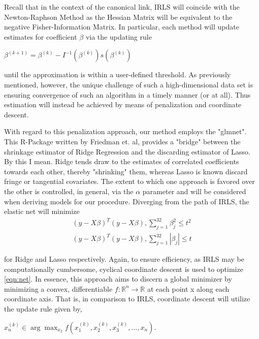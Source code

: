\documentclass[11pt]{article}
\begin{document}
  	Recall that in the context of the canonical link, IRLS will coincide with the Newton-Raphson Method as the Hessian Matrix will be equivalent to the negative Fisher-Information Matrix.  In particular, each method will update estimates for coefficient $\beta$ via the updating rule 
	
\begin{center}
$\beta^{(k+1)}=\beta^{(k)}-I^{-1}(\beta^{(k)})s(\beta^{(k)})$
\end{center}

 until the approximation is within a user-defined threshold.  As previously mentioned, however, the unique challenge of such a high-dimensional data set is ensuring convergence of such an algorithm in a timely manner (or at all).  Thus estimation will instead be achieved by means of penalization and coordinate descent.  
 	
	With regard to this penalization approach, our method employs the "glmnet".  This R-Package written by Friedman et. al, provides a "bridge" between the shrinkage estimator of Ridge Regression and the discarding estimator of Lasso.  By this I mean. Ridge tends draw to the estimates of correlated coefficients towards each other, thereby "shrinking" them, whereas Lasso is known discard fringe or tangential covariates.  The extent to which one approach is favored over the other is controlled, in general, via the $\alpha$ parameter and will be considered when deriving models for our procedure.   Diverging from the path of IRLS, the elastic net will minimize
	\begin{equation}
	\begin{align*}
\label{eqn:net}
(y-X\beta)^T(y-X\beta), \sum_{j=1}^{32} \beta_j^2 \le t^2 \\
(y-X\beta)^T(y-X\beta), \sum_{j=1}^{32} |\beta_j| \le t
\end{align*}
\end{equation}  

 for Ridge and Lasso respectively.   Again, to ensure efficiency, as IRLS may be computationally cumbersome, cyclical coordinate descent is used to optimize \eqref{eqn:net}.   In essence, this approach aims to discern a global minimizer by minimizing a convex, differentiable $f:\mathbb{R}^n \rightarrow \mathbb{R}$ at each point x along each coordinate axis.  That is, in comparison to IRLS, coordinate descent will utilize the update rule given by, 
 
 \begin{center}
 $x_n^{(k)} \in \arg\max_{x_2} f(x_1^{(k)},x_2^{(k)},x_3^{(k)},...,x_n)$.
 \end{center}
\end{document}

